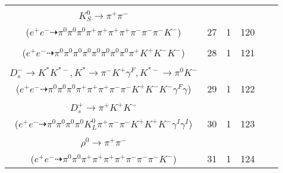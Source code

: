 \documentclass[landscape]{article}
\newcounter{rownumbers}
\newcommand\rn{\stepcounter{rownumbers}\arabic{rownumbers}}
\newcommand{\EOLP}{\\ \hline} %
\newcommand{\topoTags}[1]{#1} %
\begin{document}
\begin{longtable}{clcccc}
\rn & \makecell[l]{ $ 
e^{+} e^{-} \rightarrow \pi^{0} \rho^{-} D^{+} \bar{D}^{0} ,
\rho^{-} \rightarrow \pi^{0} \pi^{-} ,
D^{+} \rightarrow \pi^{+} \pi^{+} K^{-} ,
\bar{D}^{0} \rightarrow \pi^{+} \pi^{-} K^{*} ,
K^{*} \rightarrow \pi^{0} K^{0} ,
K^{0} \rightarrow K_{S}^{0} ,
$ \\ $
K_{S}^{0} \rightarrow \pi^{+} \pi^{-} 
$ \\ ($
e^{+} e^{-} \dashrightarrow \pi^{0} \pi^{0} \pi^{0} \pi^{+} \pi^{+} \pi^{+} \pi^{+} \pi^{-} \pi^{-} \pi^{-} K^{-} 
$) } & \topoTags{27 & }1 & 120 \EOLP

\rn & \makecell[l]{ $ 
e^{+} e^{-} \rightarrow \pi^{0} \pi^{0} D^{0} \bar{D}^{*0} ,
D^{0} \rightarrow \pi^{+} K^{+} K^{-} K^{-} ,
\bar{D}^{*0} \rightarrow \pi^{0} \bar{D}^{0} ,
\bar{D}^{0} \rightarrow \pi^{0} \pi^{0} \pi^{0} K_{S}^{0} ,
K_{S}^{0} \rightarrow \pi^{0} \pi^{0} 
$ \\ ($
e^{+} e^{-} \dashrightarrow \pi^{0} \pi^{0} \pi^{0} \pi^{0} \pi^{0} \pi^{0} \pi^{0} \pi^{0} \pi^{+} K^{+} K^{-} K^{-} 
$) } & \topoTags{28 & }1 & 121 \EOLP

\rn & \makecell[l]{ $ 
e^{+} e^{-} \rightarrow \pi^{0} K^{0} D^{*+} D_{s}^{*-} ,
K^{0} \rightarrow K_{S}^{0} ,
D^{*+} \rightarrow \pi^{+} D^{0} ,
D_{s}^{*-} \rightarrow D_{s}^{-} \gamma ,
K_{S}^{0} \rightarrow \pi^{+} \pi^{-} ,
D^{0} \rightarrow \pi^{0} \pi^{+} K^{-} ,
$ \\ $
D_{s}^{-} \rightarrow K^{*} K^{*-} ,
K^{*} \rightarrow \pi^{-} K^{+} \gamma^{F} ,
K^{*-} \rightarrow \pi^{0} K^{-} 
$ \\ ($
e^{+} e^{-} \dashrightarrow \pi^{0} \pi^{0} \pi^{0} \pi^{+} \pi^{+} \pi^{+} \pi^{-} \pi^{-} K^{+} K^{-} K^{-} \gamma^{F} \gamma 
$) } & \topoTags{29 & }1 & 122 \EOLP

\rn & \makecell[l]{ $ 
e^{+} e^{-} \rightarrow \bar{K}^{0} K^{*} D_{s}^{-} D_{s}^{*+} \gamma^{I} \gamma^{I} ,
\bar{K}^{0} \rightarrow K_{L}^{0} ,
K^{*} \rightarrow \pi^{-} K^{+} ,
D_{s}^{-} \rightarrow \pi^{0} \pi^{-} K_{S}^{0} ,
D_{s}^{*+} \rightarrow \pi^{0} D_{s}^{+} ,
K_{S}^{0} \rightarrow \pi^{0} \pi^{0} ,
$ \\ $
D_{s}^{+} \rightarrow \pi^{+} K^{+} K^{-} 
$ \\ ($
e^{+} e^{-} \dashrightarrow \pi^{0} \pi^{0} \pi^{0} \pi^{0} K_{L}^{0} \pi^{+} \pi^{-} \pi^{-} K^{+} K^{+} K^{-} \gamma^{I} \gamma^{I} 
$) } & \topoTags{30 & }1 & 123 \EOLP

\rn & \makecell[l]{ $ 
e^{+} e^{-} \rightarrow \pi^{+} D^{0} D_{1}^{\prime-} ,
D^{0} \rightarrow \pi^{0} \pi^{+} K^{-} ,
D_{1}^{\prime-} \rightarrow \pi^{-} \bar{D}^{*0} ,
\bar{D}^{*0} \rightarrow \pi^{0} \bar{D}^{0} ,
\bar{D}^{0} \rightarrow \rho^{0} \rho^{0} ,
\rho^{0} \rightarrow \pi^{+} \pi^{-} ,
$ \\ $
\rho^{0} \rightarrow \pi^{+} \pi^{-} 
$ \\ ($
e^{+} e^{-} \dashrightarrow \pi^{0} \pi^{0} \pi^{+} \pi^{+} \pi^{+} \pi^{+} \pi^{-} \pi^{-} \pi^{-} K^{-} 
$) } & \topoTags{31 & }1 & 124 \EOLP


\end{longtable}
\end{document}
